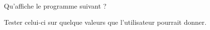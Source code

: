 
\begin{exercice}\label{exosmath-0526}

    Qu'affiche le programme suivant ?

    

    Tester celui-ci sur quelque valeurs que l'utilisateur pourrait donner.

    

\end{exercice}
